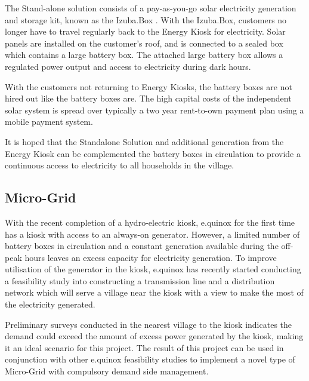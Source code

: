 The Stand-alone solution consists of a pay-as-you-go solar electricity generation and storage kit, known as the Izuba.Box \cite{e.quinox-Standalone-web:2012}.  With the Izuba.Box, customers no longer have to travel regularly back to the Energy Kiosk for electricity. Solar panels are installed on the customer's roof, and is connected to a sealed box which contains a large battery box. The attached large battery box allows a regulated power output and access to electricity during dark hours. 

With the customers not returning to Energy Kiosks, the battery boxes are not hired out like the battery boxes are. The high capital costs of the independent solar system is spread over typically a two year rent-to-own payment plan using a mobile payment system.

It is hoped that the Standalone Solution and additional generation from the Energy Kiosk can be complemented the battery boxes in circulation to provide a continuous access to electricity to all households in the village.

\subsection*{Micro-Grid}
With the recent completion of a hydro-electric kiosk, e.quinox for the first time has a kiosk with access to an always-on generator. However, a limited number of battery boxes in circulation and a constant generation available during the off-peak hours leaves an excess capacity for electricity generation. To improve utilisation of the generator in the kiosk, e.quinox has recently started conducting a feasibility study into constructing a transmission line and a distribution network which will serve a village near the kiosk with a view to make the most of the electricity generated.

Preliminary surveys conducted in the nearest village to the kiosk indicates the demand could exceed the amount of excess power generated by the kiosk, making it an ideal scenario for this project. The result of this project can be used in conjunction with other e.quinox feasibility studies to implement a novel type of Micro-Grid with compulsory demand side management. 

